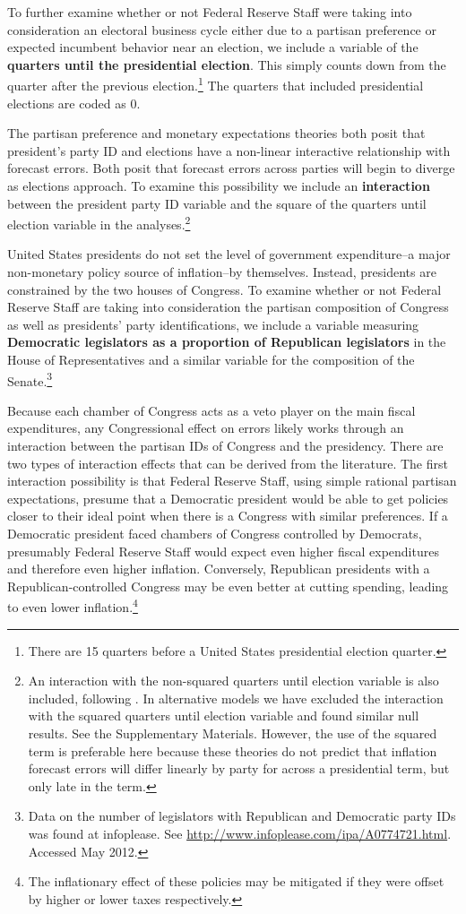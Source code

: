 \documentclass[a4paper]{article}
\begin{document}
To further examine whether or not Federal Reserve Staff were taking into consideration an electoral business cycle either due to a partisan preference or expected incumbent behavior near an election, we include a variable of the {\bf{quarters until the presidential election}}. This simply counts down from the quarter after the previous election.\footnote{There are 15 quarters before a United States presidential election quarter.} The quarters that included presidential elections are coded as 0. 

The partisan preference and monetary expectations theories both posit that president's party ID and elections have a non-linear interactive relationship with forecast errors. Both posit that forecast errors across parties will begin to diverge as elections approach. To examine this possibility we include an \textbf{interaction} between the president party ID variable and the square of the quarters until election variable in the analyses.\footnote{An interaction with the non-squared quarters until election variable is also included, following \citep{Brambor2006}. In alternative models we have excluded the interaction with the squared quarters until election variable and found similar null results. See the Supplementary Materials. However, the use of the squared term is preferable here because these theories do not predict that inflation forecast errors will differ linearly by party for across a presidential term, but only late in the term.}

United States presidents do not set the level of government expenditure--a major non-monetary policy source of inflation--by themselves. Instead, presidents are constrained by the two houses of Congress. To examine whether or not Federal Reserve Staff are taking into consideration the partisan composition of Congress as well as presidents' party identifications, we include a variable measuring {\bf{Democratic legislators as a proportion of Republican legislators}} in the House of Representatives and a similar variable for the composition of the Senate.\footnote{Data on the number of legislators with Republican and Democratic party IDs was found at infoplease. See {\url{http://www.infoplease.com/ipa/A0774721.html}}. Accessed May 2012.} 

Because each chamber of Congress acts as a veto player on the main fiscal expenditures, any Congressional effect on errors likely works through an interaction between the partisan IDs of Congress and the presidency. There are two types of interaction effects that can be derived from the literature. The first interaction possibility is that Federal Reserve Staff, using simple rational partisan expectations, presume that a Democratic president would be able to get policies closer to their ideal point when there is a Congress with similar preferences. If a Democratic president faced chambers of Congress controlled by Democrats, presumably Federal Reserve Staff would expect even higher fiscal expenditures and therefore even higher inflation. Conversely, Republican presidents with a Republican-controlled Congress may be even better at cutting spending, leading to even lower inflation.\footnote{The inflationary effect of these policies may be mitigated if they were offset by higher or lower taxes respectively.}
\end{document}
